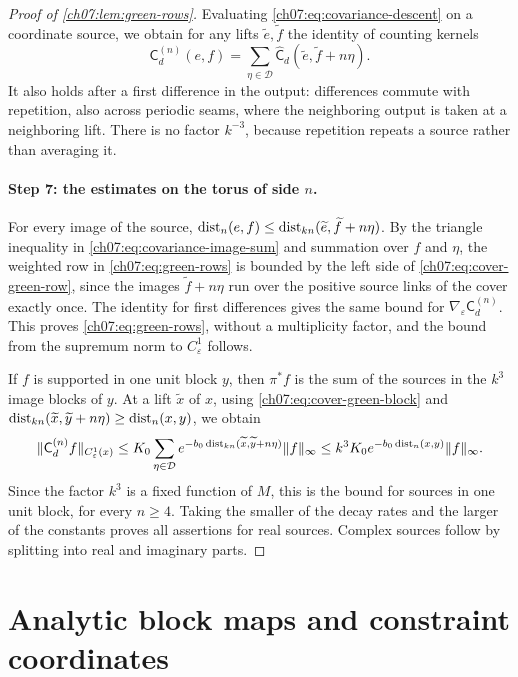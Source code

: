 \begin{proof}[Proof of \cref{ch07:lem:green-rows}]
Evaluating \eqref{ch07:eq:covariance-descent} on a coordinate source, we obtain for any lifts $\widetilde e,\widetilde f$ the identity of counting kernels
\begin{equation}\label{ch07:eq:covariance-image-sum}
 \mathsf C_d^{(n)}(e,f)=\sum_{\eta\in\mathcal D}\widehat{\mathsf C}_d(\widetilde e,\widetilde f+n\eta).
\end{equation}
It also holds after a first difference in the output: differences commute with repetition, also across periodic seams, where the neighboring output is taken at a neighboring lift. There is no factor $k^{-3}$, because repetition repeats a source rather than averaging it.

\paragraph{Step 7: the estimates on the torus of side $n$.}
For every image of the source, $\operatorname{dist}_n(e,f)\le\operatorname{dist}_{kn}(\widetilde e,\widetilde f+n\eta)$. By the triangle inequality in \eqref{ch07:eq:covariance-image-sum} and summation over $f$ and $\eta$, the weighted row in \eqref{ch07:eq:green-rows} is bounded by the left side of \eqref{ch07:eq:cover-green-row}, since the images $\widetilde f+n\eta$ run over the positive source links of the cover exactly once. The identity for first differences gives the same bound for $\nabla_\varepsilon\mathsf C_d^{(n)}$. This proves \eqref{ch07:eq:green-rows}, without a multiplicity factor, and the bound from the supremum norm to $C^1_\varepsilon$ follows.

If $f$ is supported in one unit block $y$, then $\pi^*f$ is the sum of the sources in the $k^3$ image blocks of $y$. At a lift $\widetilde x$ of $x$, using \eqref{ch07:eq:cover-green-block} and $\operatorname{dist}_{kn}(\widetilde x,\widetilde y+n\eta)\ge\operatorname{dist}_n(x,y)$, we obtain
\[
 \lVert \mathsf C_d^{(n)}f\rVert_{C^1_\varepsilon(x)}
 \le K_0\sum_{\eta\in\mathcal D}e^{-b_0\operatorname{dist}_{kn}(\widetilde x,\widetilde y+n\eta)}\lVert f\rVert_\infty
 \le k^3K_0e^{-b_0\operatorname{dist}_n(x,y)}\lVert f\rVert_\infty .
\]
Since the factor $k^3$ is a fixed function of $M$, this is the bound for sources in one unit block, for every $n\ge4$. Taking the smaller of the decay rates and the larger of the constants proves all assertions for real sources. Complex sources follow by splitting into real and imaginary parts.
\end{proof}

\section{Analytic block maps and constraint coordinates}\label{ch07:sec:block-maps}

